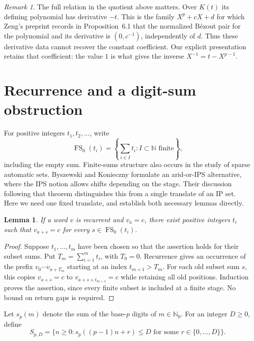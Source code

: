 \documentclass[11pt]{article}
\newtheorem{lemma}[theorem]{Lemma}
\theoremstyle{remark}
\newtheorem{remark}[theorem]{Remark}
\DeclareMathOperator{\FS}{FS}
\newcommand{\Nzero}{\mathbb N_0}
\begin{document}
\begin{remark}\label{rem:characteristic}
The full relation in the quotient above matters. Over $K(t)$ its defining
polynomial has derivative $-t$. This is the family $X^p+cX+d$ for which
Zeng's preprint \cite{Zeng_2026} records in Proposition~6.1 that the normalized
Bézout pair for the polynomial and its derivative is $(0,c^{-1})$,
independently of $d$. Thus these derivative data cannot recover the
constant coefficient. Our explicit presentation retains that coefficient:
the value $1$ is what gives the inverse $X^{-1}=t-X^{p-1}$.
\end{remark}

\section{Recurrence and a digit-sum obstruction}

For positive integers $t_1,t_2,\ldots$, write
\[
 \FS_0(t_i)=\left\{\sum_{i\in I}t_i:
          I\subset\mathbb N\text{ finite}\right\},
\]
including the empty sum. Finite-sums structure also occurs in the study of
sparse automatic sets. Byszewski and Konieczny
\cite[Definition~3.11 and Theorem~3.13]{ByszewskiKonieczny2020}
formulate an arid-or-IPS alternative, where the IPS notion allows shifts
depending on the stage. Their discussion following that theorem
distinguishes this from a single translate of an IP set. Here we need one
fixed translate, and establish both necessary lemmas directly.

\begin{lemma}\label{lem:returns}
If a word $v$ is recurrent and $v_a=c$, there exist positive integers $t_i$
such that $v_{a+s}=c$ for every $s\in\FS_0(t_i)$.
\end{lemma}
\begin{proof}
Suppose $t_1,\ldots,t_m$ have been chosen so that the assertion holds for
their subset sums. Put $T_m=\sum_{i=1}^m t_i$, with $T_0=0$.
Recurrence gives an occurrence of the prefix $v_0\cdots v_{a+T_m}$
starting at an index $t_{m+1}>T_m$. For each old subset sum $s$, this
copies $v_{a+s}=c$ to $v_{a+s+t_{m+1}}=c$ while retaining all old
positions. Induction proves the assertion, since every finite subset
is included at a finite stage. No bound on return gaps is required.
\end{proof}

Let $s_p(m)$ denote the sum of the base-$p$ digits of $m\in\Nzero$.
For an integer $D\geq0$, define
\begin{equation}\label{eq:SD}
 S_{p,D}=\{n\geq0:s_p((p-1)n+r)\leq D
                   \text{ for some }r\in\{0,\ldots,D\}\}.
\end{equation}
\end{document}
